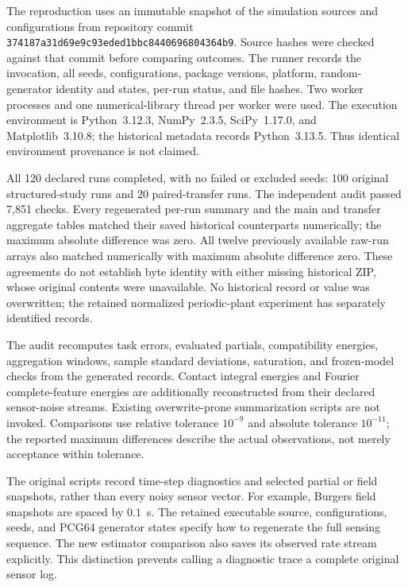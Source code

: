 \documentclass[journal]{IEEEtran}
\begin{document}
The reproduction uses an immutable snapshot of the simulation sources and
configurations from repository commit
\texttt{374187a31d69e9c93eded1bbc8440696804364b9}.
Source hashes were checked against that commit before comparing outcomes.
The runner records the invocation, all seeds, configurations, package
versions, platform, random-generator identity and states, per-run status,
and file hashes. Two worker processes and one numerical-library thread per
worker were used. The execution environment is Python~3.12.3,
NumPy~2.3.5, SciPy~1.17.0, and Matplotlib~3.10.8; the historical metadata
records Python~3.13.5. Thus identical environment provenance is not claimed.

All 120 declared runs completed, with no failed or excluded seeds:
100 original structured-study runs and 20 paired-transfer runs. The independent audit
passed 7,851 checks. Every regenerated per-run summary and the main and
transfer aggregate tables matched their saved historical counterparts
numerically; the maximum absolute difference was zero. All twelve
previously available raw-run arrays also matched numerically with
maximum absolute difference zero. These agreements do not establish
byte identity with either missing historical ZIP, whose original
contents were unavailable. No historical record or value was overwritten;
the retained normalized periodic-plant experiment has separately identified records.
%

The audit recomputes task errors, evaluated partials, compatibility
energies, aggregation windows, sample standard deviations, saturation,
and frozen-model checks from the generated records. Contact integral
energies and Fourier complete-feature energies are additionally
reconstructed from their declared sensor-noise streams. Existing
overwrite-prone summarization scripts are not invoked. Comparisons use
relative tolerance $10^{-9}$ and absolute tolerance $10^{-11}$;
the reported maximum differences describe the actual observations, not
merely acceptance within tolerance.

The original scripts record time-step diagnostics and selected partial or
field snapshots, rather than every noisy sensor vector. For example,
Burgers field snapshots are spaced by $0.1$~s. The retained executable
source, configurations, seeds, and PCG64 generator states specify how to
regenerate the full sensing sequence. The new estimator comparison also
saves its observed rate stream explicitly. This distinction prevents
calling a diagnostic trace a complete original sensor log.
\end{document}
